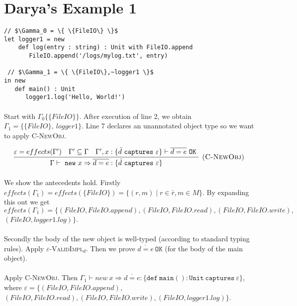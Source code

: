 \documentclass{llncs}
\newcommand{\keywadj}[1]{\mathtt{#1}}
\newcommand{\keyw}[1]{\keywadj{#1}~}
\begin{document}
\section{Darya's Example 1}
\vspace{-6pt}
\begin{lstlisting}[xleftmargin=20pt]
// $\Gamma_0 = \{ \{FileIO\} \}$
let logger1 = new
    def log(entry : string) : Unit with FileIO.append
       FileIO.append('/logs/mylog.txt', entry)
 
 // $\Gamma_1 = \{ \{FileIO\},~logger1 \}$
in new
   def main() : Unit
      logger1.log('Hello, World!')
\end{lstlisting}

\paragraph{}
Start with $\Gamma_0 \{ \{FileIO\} \}$. After execution of line 2, we obtain $\Gamma_1 = \{ \{FileIO\},~logger1 \}$. Line 7 declares an unannotated object type so we want to apply \textsc{C-NewObj}.

\[
\begin{array}{c}
\infer[\textsc{(C-NewObj)}]
	{\Gamma \vdash~\keywadj{new}~x \Rightarrow \overline{d = e} : \{  \bar d~\keyw{captures} \varepsilon \} }
	{\varepsilon = effects(\Gamma') & \Gamma' \subseteq \Gamma & \Gamma', x : \{ \bar d~\keyw {captures} \varepsilon \} \vdash \overline{d = e}~\keyw{OK}} \\
\end{array}
\]

\paragraph{}
We show the antecedents hold. Firstly $effects(\Gamma_1) = effects(\{FileIO\}) = \{ (r, m) \mid r \in \bar r, m \in M \}$. By expanding this out we get $effects(\Gamma_1) = \{ (FileIO, FileIO.append), (FileIO, FileIO.read), (FileIO, FileIO.write),$\\$(FileIO, logger1.log) \}$.

\paragraph{}
Secondly the body of the new object is well-typed (according to standard typing rules). Apply \textsc{$\varepsilon$-ValidImpl$_d$}. Then we prove $\overline{d = e}~\keywadj{OK}$ (for the body of the main object).

\paragraph{}
Apply \textsc{C-NewObj}. Then $\Gamma_1 \vdash new~x \Rightarrow \overline{d = e} : \{ \keywadj{def~main}() : \keyw{Unit~captures} \varepsilon\}$, where $\varepsilon =\{ (FileIO, FileIO.append),$\\$(FileIO, FileIO.read), (FileIO, FileIO.write),(FileIO, logger1.log) \}$.
\end{document}
